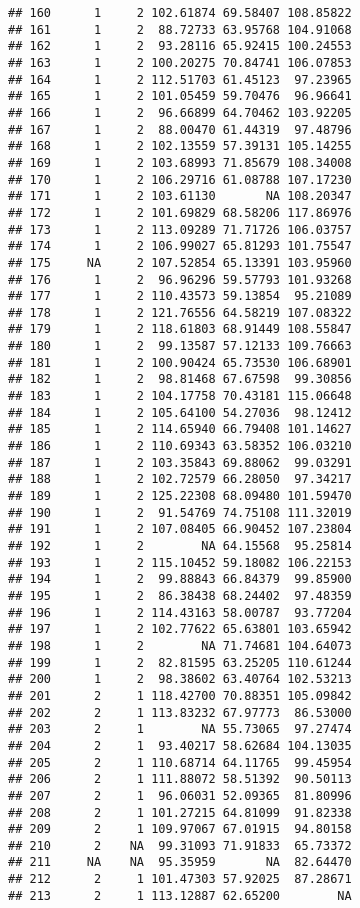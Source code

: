 \documentclass[
]{article}
\begin{document}
\begin{verbatim}
## 160      1     2 102.61874 69.58407 108.85822
## 161      1     2  88.72733 63.95768 104.91068
## 162      1     2  93.28116 65.92415 100.24553
## 163      1     2 100.20275 70.84741 106.07853
## 164      1     2 112.51703 61.45123  97.23965
## 165      1     2 101.05459 59.70476  96.96641
## 166      1     2  96.66899 64.70462 103.92205
## 167      1     2  88.00470 61.44319  97.48796
## 168      1     2 102.13559 57.39131 105.14255
## 169      1     2 103.68993 71.85679 108.34008
## 170      1     2 106.29716 61.08788 107.17230
## 171      1     2 103.61130       NA 108.20347
## 172      1     2 101.69829 68.58206 117.86976
## 173      1     2 113.09289 71.71726 106.03757
## 174      1     2 106.99027 65.81293 101.75547
## 175     NA     2 107.52854 65.13391 103.95960
## 176      1     2  96.96296 59.57793 101.93268
## 177      1     2 110.43573 59.13854  95.21089
## 178      1     2 121.76556 64.58219 107.08322
## 179      1     2 118.61803 68.91449 108.55847
## 180      1     2  99.13587 57.12133 109.76663
## 181      1     2 100.90424 65.73530 106.68901
## 182      1     2  98.81468 67.67598  99.30856
## 183      1     2 104.17758 70.43181 115.06648
## 184      1     2 105.64100 54.27036  98.12412
## 185      1     2 114.65940 66.79408 101.14627
## 186      1     2 110.69343 63.58352 106.03210
## 187      1     2 103.35843 69.88062  99.03291
## 188      1     2 102.72579 66.28050  97.34217
## 189      1     2 125.22308 68.09480 101.59470
## 190      1     2  91.54769 74.75108 111.32019
## 191      1     2 107.08405 66.90452 107.23804
## 192      1     2        NA 64.15568  95.25814
## 193      1     2 115.10452 59.18082 106.22153
## 194      1     2  99.88843 66.84379  99.85900
## 195      1     2  86.38438 68.24402  97.48359
## 196      1     2 114.43163 58.00787  93.77204
## 197      1     2 102.77622 65.63801 103.65942
## 198      1     2        NA 71.74681 104.64073
## 199      1     2  82.81595 63.25205 110.61244
## 200      1     2  98.38602 63.40764 102.53213
## 201      2     1 118.42700 70.88351 105.09842
## 202      2     1 113.83232 67.97773  86.53000
## 203      2     1        NA 55.73065  97.27474
## 204      2     1  93.40217 58.62684 104.13035
## 205      2     1 110.68714 64.11765  99.45954
## 206      2     1 111.88072 58.51392  90.50113
## 207      2     1  96.06031 52.09365  81.80996
## 208      2     1 101.27215 64.81099  91.82338
## 209      2     1 109.97067 67.01915  94.80158
## 210      2    NA  99.31093 71.91833  65.73372
## 211     NA    NA  95.35959       NA  82.64470
## 212      2     1 101.47303 57.92025  87.28671
## 213      2     1 113.12887 62.65200        NA

\end{verbatim}
\end{document}
